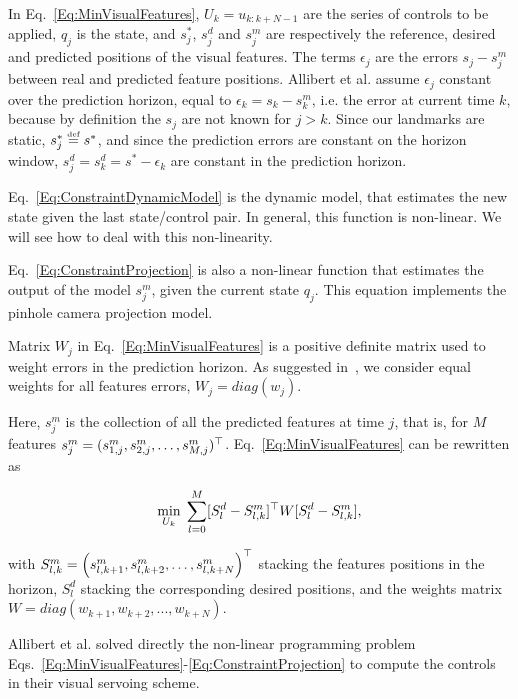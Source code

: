 In Eq.~\ref{Eq:MinVisualFeatures}, $U_{k}=u_{k:k+N-1}$ are the series of controls to be applied, $q_j$ is the state, and $s^*_j$, $s^d_j$ and $s^m_j$ are respectively the reference, desired and predicted positions of the visual features. The terms $\epsilon_j$ are the errors $s_j-s^m_j$ between real and predicted feature positions.
Allibert et al. assume $\epsilon_j$ constant over the prediction horizon, equal to $\epsilon_k=s_k-s^m_k$, i.e. the error at current time $k$, because by definition the $s_j$ are not known for $j>k$.
Since our landmarks are static, $s^*_j \stackrel{\mbox{\tiny def}}{=} s^*$, and since the prediction errors are constant on the horizon window, $s^d_j=s^d_k=s^*-\epsilon_k$ are constant in the prediction horizon.

Eq.~\ref{Eq:ConstraintDynamicModel} is the dynamic model, that estimates the new state given the last state/control pair. In general, this function is non-linear. We will see how to deal with this non-linearity.

Eq.~\ref{Eq:ConstraintProjection} is also a non-linear function that estimates the output of the model $s^m_j$, given the current state $q_j$. This equation implements the pinhole camera projection model.

Matrix $W_j$ in Eq.~\ref{Eq:MinVisualFeatures} is a positive definite matrix  used to weight errors in the prediction horizon. As suggested in~\citep{Allibert2010}, we   consider equal weights for all features errors, $W_j = diag(w_j)$. 

Here, $s^m_j$ is the collection of all the predicted features at time $j$, that is, for $M$ features $s^m_j = ( s_{1,j}^m, s_{2,j}^m, \hdots, s_{M,j}^m )^{\top} $. Eq.~\ref{Eq:MinVisualFeatures} can be rewritten as

\begin{equation}
\label{Eq:MinVisualFeatures2}
 \min_{U_{k}} \; \sum\limits_{l=0}^{M}  [S^d_{l} - S^m_{l,k}]^{\top} W [S^d_{l} - S^m_{l,k}],
\end{equation}

\noindent with $S^m_{l,k} =  \left(
  s^m_{l,k+1},
  s^m_{l,k+2},
 \dots,
  s^m_{l,k+N}
 \right)^{\top}$ stacking the features positions in the horizon, $S^d_{l}$ stacking the corresponding desired positions, and the weights matrix $W = diag(w_{k+1},w_{k+2},...,w_{k+N})$.

Allibert et al. solved directly the non-linear programming problem Eqs.~\ref{Eq:MinVisualFeatures}-\ref{Eq:ConstraintProjection} to compute the controls in their visual servoing scheme.

